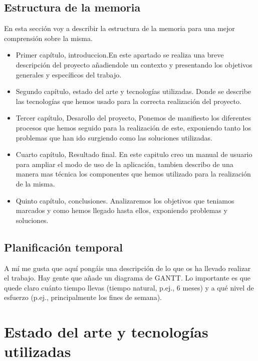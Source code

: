 \documentclass[a4paper, 12pt]{book}
\begin{document}
\section{Estructura de la memoria}
\label{sec:estructura}
En esta sección voy a describir la estructura de la memoria para una mejor 
comprensión sobre la misma.
\begin{itemize}
\item Primer capítulo, introduccion.En este apartado se realiza una breve descripción del proyecto añadiendole un contexto y presentando los objetivos generales y específicos del trabajo.
\item Segundo capítulo, estado del arte y tecnologías utilizadas. Donde se describe las tecnologías que hemos usado para la correcta realización del proyecto.
\item Tercer capítulo, Desarollo del proyecto, Ponemos de manifiesto los diferentes procesos que hemos seguido para la realización de este, exponiendo tanto los problemas que han ido surgiendo como las soluciones utilizadas.
\item Cuarto capítulo, Resultado final. En este capitulo creo un manual de usuario para ampliar el modo de uso de la aplicación, tambien describo de una manera mas técnica los componentes que hemos utilizado para la realización de la misma.
\item Quinto capítulo, conclusiones. Analizaremos los objetivos que teniamos marcados y como hemos llegado hasta ellos, exponiendo problemas y soluciones.
\end{itemize}

\section{Planificación temporal}
\label{sec:planificacion-temporal}

A mí me gusta que aquí pongáis una descripción de lo que os ha llevado realizar el trabajo.
Hay gente que añade un diagrama de GANTT.
Lo importante es que quede claro cuánto tiempo llevas (tiempo natural, p.ej., 6 meses) y a qué nivel de esfuerzo (p.ej., principalmente los fines de semana).

\cleardoublepage %
\chapter{Estado del arte y tecnologías utilizadas} %
\label{chap:objetivos} %
\end{document}
